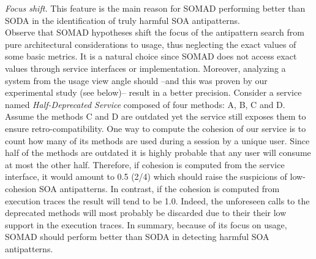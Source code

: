 \noindent \emph{Focus shift.} This feature is the main reason for SOMAD performing better than SODA in the identification of truly harmful SOA antipatterns. 
\vspace{.15cm}
\\
\noindent Observe that SOMAD hypotheses shift the focus of the antipattern search from pure architectural considerations to usage, thus neglecting the exact values of some basic metrics. It is a natural choice since SOMAD does not access exact values through service interfaces or implementation. Moreover, analyzing a system from the usage view angle should --and this was proven by our experimental study (see below)-- result in a better precision. Consider a service named \emph{Half-Deprecated Service} composed of four methods: A, B, C and D. Assume the methods C and D are outdated yet the service still exposes them to ensure retro-compatibility. One way to compute the cohesion of our service is to count how many of its methods are used during a session by a unique user. Since half of the methods are outdated it is highly probable that any user will consume at most the other half. Therefore, if cohesion is computed from the service interface, it would amount to 0.5 (2/4) which should raise the suspicions of low-cohesion SOA antipatterns. In contrast, if the cohesion is computed from execution traces the result will tend to be 1.0. Indeed, the unforeseen calls to the deprecated methods will most probably be discarded due to their their low support in the execution traces. In summary,  because of its focus on usage, SOMAD should perform better than SODA in detecting harmful SOA antipatterns.